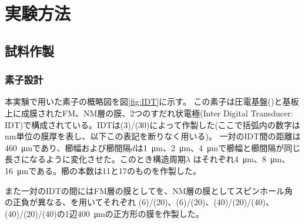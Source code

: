 \documentclass[dvipdfmx]{jsreport}
\numberwithin{equation}{chapter}
\numberwithin{table}{chapter}
\begin{document}
\chapter{実験方法}
\section{試料作製}
\subsection{素子設計}
本実験で用いた素子の概略図を図\ref{fig:IDT}に示す。
この素子は圧電基盤()と基板上に成膜されたFM、NM層の膜、2つのすだれ状電極(Inter Digital Transducer: IDT)で構成されている。IDTは(3)/(30)によって作製した(ここで括弧内の数字は\si{\nano \metre}単位の膜厚を表し、以下この表記を断りなく用いる)。
一対のIDT間の距離は\SI{460}{\micro \metre}であり、櫛幅および櫛間隔$d$は\SI{1}{\micro \metre}、\SI{2}{\micro \metre}、\SI{4}{\micro \metre}で櫛幅と櫛間隔が同じ長さになるように変化させた。このとき構造周期$\lambda$ はそれぞれ\SI{4}{\micro \metre}、\SI{8}{\micro \metre}、\SI{16}{\micro \metre}である。櫛の本数は11と17のものを作製した。

また一対のIDTの間にはFM層の膜としてを、NM層の膜としてスピンホール角の正負が異なる、を用いてそれぞれ
(6)/(20)、(6)/(20)、(40)/(20)/(40)、(40)/(20)/(40)の1辺\SI{400}{\micro \metre}の正方形の膜を作製した。
\end{document}
